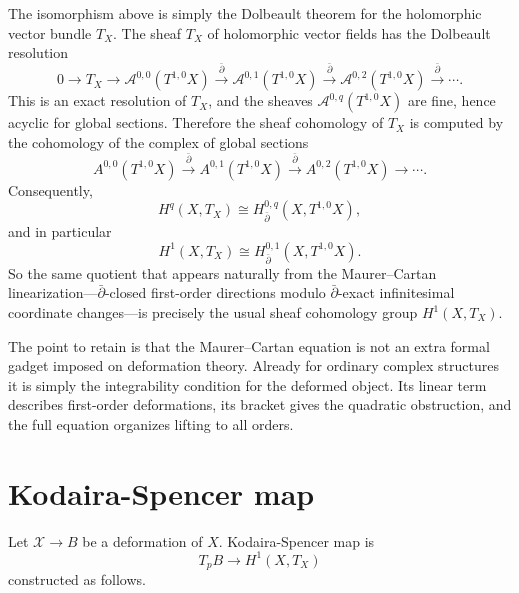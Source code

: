 The isomorphism above is simply the Dolbeault theorem for
the holomorphic vector bundle $T_X$. The sheaf $T_X$ of
holomorphic vector fields has the Dolbeault resolution
$$
0\longrightarrow T_X
\longrightarrow \mathcal A^{0,0}(T^{1,0}X)
\xrightarrow{\bar\partial}
\mathcal A^{0,1}(T^{1,0}X)
\xrightarrow{\bar\partial}
\mathcal A^{0,2}(T^{1,0}X)
\xrightarrow{\bar\partial}\cdots .
$$
This is an exact resolution of $T_X$, and the sheaves
$\mathcal A^{0,q}(T^{1,0}X)$ are fine, hence acyclic for
global sections. Therefore the sheaf cohomology of $T_X$
is computed by the cohomology of the complex of global
sections
$$
A^{0,0}(T^{1,0}X)
\xrightarrow{\bar\partial}
A^{0,1}(T^{1,0}X)
\xrightarrow{\bar\partial}
A^{0,2}(T^{1,0}X)
\longrightarrow\cdots .
$$
Consequently,
$$
H^q(X,T_X)\cong H^{0,q}_{\bar\partial}
(X,T^{1,0}X),
$$
and in particular
$$
H^1(X,T_X)\cong H^{0,1}_{\bar\partial}
(X,T^{1,0}X).
$$
So the same quotient that appears naturally from the
Maurer--Cartan linearization---$\bar\partial$-closed
first-order directions modulo $\bar\partial$-exact
infinitesimal coordinate changes---is precisely the usual
sheaf cohomology group $H^1(X,T_X)$.

\medskip\noindent
The point to retain is that the Maurer--Cartan equation
is not an extra formal gadget imposed on deformation
theory. Already for ordinary complex structures it is
simply the integrability condition for the deformed
object. Its linear term describes first-order
deformations, its bracket gives the quadratic
obstruction, and the full equation organizes lifting to
all orders.

\section{Kodaira-Spencer map}
\label{section-kodaira-spencer-map}

\noindent
Let $\mathcal{X} \to B$ be a
deformation of $X$.
Kodaira-Spencer map is
$$
T_pB \to H^1(X,T_X)
$$
constructed as follows.

